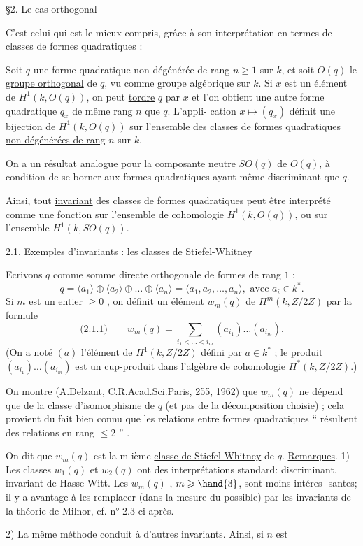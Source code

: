 
§2. Le cas orthogonal

C'est celui qui est le mieux compris, grâce à son interprétation en termes
de classes de formes quadratiques :

Soit $q$ une forme quadratique non dégénérée de rang $n \geqslant 1$ sur $k$,
et soit $O(q)$ le \uline{groupe orthogonal} de $q$, vu comme groupe algébrique
sur $k$. Si $x$ est un élément de $H^1(k, O(q))$, on peut \uline{tordre} $q$ par $x$ et
l'on obtient une autre forme quadratique $q_x$ de même rang $n$ que $q$. L'appli-%
cation $x \longmapsto (q_x)$ définit une \uline{bijection} de $H^1(k, O(q))$ sur l'ensemble des
\uline{classes de formes quadratiques non dégénérées de rang} $n$ sur $k$.

On a un résultat analogue pour la composante neutre $SO(q)$ de $O(q)$, à
condition de se borner aux formes quadratiques ayant même discriminant que $q$.

Ainsi, tout \uline{invariant} des classes de formes quadratiques peut être
interprété comme une fonction sur l'ensemble de cohomologie $H^1(k, O(q))$,
ou sur l'ensemble $H^1(k, SO(q))$.

2.1. Exemples d'invariants : les classes de Stiefel-Whitney

Ecrivons $q$ comme somme directe orthogonale  de formes de
rang $1$ :
\[ q = \langle a_1\rangle \oplus \langle a_2\rangle \oplus \ldots \oplus \langle a_n\rangle = \langle a_1, a_2, \ldots, a_n\rangle , \text{ avec } a_i \in k^* . \]
Si $m$ est un entier $\geqslant 0$ , on définit un élément $w_m(q)$ de $H^m(k, Z/2Z)$
par la formule
\[ \text{(2.1.1)} \qquad w_m(q) = \sum_{i_1 < \ldots < i_m} (a_{i_1})\ldots(a_{i_m}) . \]
(On a noté $(a)$ l'élément de $H^1(k, Z/2Z)$ défini par $a \in k^*$ ; le produit
$(a_{i_1})\ldots(a_{i_m})$ est un cup-produit dans l'algèbre de cohomologie $H^*(k,Z/2Z)$.)

On montre (A.Delzant, \uline{C}.\uline{R}.\uline{Acad}.\uline{Sci}.\uline{Paris}, 255, 1962) que $w_m(q)$ ne dépend
que de la classe d'isomorphisme de $q$ (et pas de la décomposition choisie) ;
cela provient du fait bien connu que les relations entre formes quadratiques
`` résultent des relations en rang $\leqslant 2$ '' .

On dit que $w_m(q)$ est la m-ième \uline{classe de Stiefel-Whitney} de $q$.
\uline{Remarques}. 1) Les classes $w_1(q)$ et $w_2(q)$ ont des interprétations standard:
discriminant, invariant de Hasse-Witt. Les $w_m(q)$ , $m \geqslant \hand{3}$, sont moins intéres-%
santes; il y a avantage à les remplacer (dans la mesure du possible)
par les invariants de la théorie de Milnor, cf. n° 2.3 ci-après.

2) La même méthode conduit à d'autres invariants. Ainsi, si $n$ est

